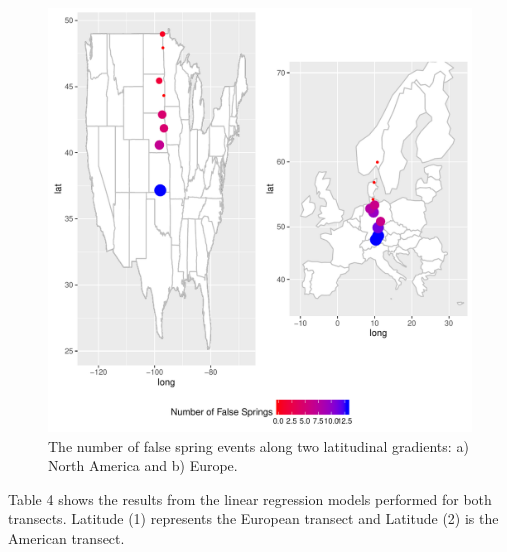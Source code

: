 \documentclass{article}\usepackage[]{graphicx}\usepackage[]{color}
\makeatletter
\def\maxwidth{ %
  \ifdim\Gin@nat@width>\linewidth
    \linewidth
  \else
    \Gin@nat@width
  \fi
}
\makeatother
\begin{document}
\begin{figure}[H]
\includegraphics[width=\maxwidth]{figure/latmap-1} \caption[The number of false spring events along two latitudinal gradients]{The number of false spring events along two latitudinal gradients: a) North America and b) Europe.}\label{fig:latmap}
\end{figure}



Table 4 shows the results from the linear regression models performed for both transects. Latitude (1) represents the European transect and Latitude (2) is the American transect. 
\end{document}
